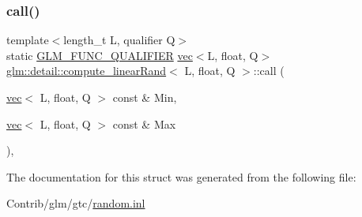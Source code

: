 \subsubsection{\texorpdfstring{call()}{call()}}
{\footnotesize\ttfamily template$<$length\+\_\+t L, qualifier Q$>$ \\
static \mbox{\hyperlink{setup_8hpp_a33fdea6f91c5f834105f7415e2a64407}{G\+L\+M\+\_\+\+F\+U\+N\+C\+\_\+\+Q\+U\+A\+L\+I\+F\+I\+ER}} \mbox{\hyperlink{structglm_1_1vec}{vec}}$<$L, float, Q$>$ \mbox{\hyperlink{structglm_1_1detail_1_1compute__linear_rand}{glm\+::detail\+::compute\+\_\+linear\+Rand}}$<$ L, float, Q $>$\+::call (\begin{DoxyParamCaption}\item[{\mbox{\hyperlink{structglm_1_1vec}{vec}}$<$ L, float, Q $>$ const \&}]{Min,  }\item[{\mbox{\hyperlink{structglm_1_1vec}{vec}}$<$ L, float, Q $>$ const \&}]{Max }\end{DoxyParamCaption})\hspace{0.3cm}{\ttfamily [inline]}, {\ttfamily [static]}}



The documentation for this struct was generated from the following file\+:\begin{DoxyCompactItemize}
\item 
Contrib/glm/gtc/\mbox{\hyperlink{random_8inl}{random.\+inl}}\end{DoxyCompactItemize}

